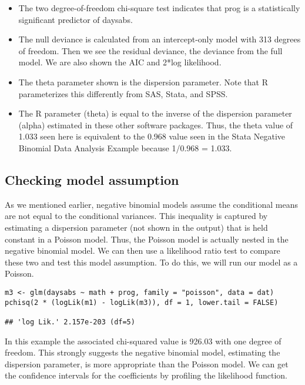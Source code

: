 \begin{itemize}
\item The two degree-of-freedom chi-square test indicates that prog is a statistically significant predictor of daysabs.
\item The null deviance is calculated from an intercept-only model with 313 degrees of freedom. Then we see the residual deviance, the deviance from the full model. We are also shown the AIC and 2*log likelihood. 
\item The theta parameter shown is the dispersion parameter. Note that R parameterizes this differently from SAS, Stata, and SPSS. 
\item The R parameter (theta) is equal to the inverse of the dispersion parameter (alpha) estimated in these other software packages. Thus, the theta value of 1.033 seen here is equivalent to the 0.968 value seen in the Stata Negative Binomial Data Analysis Example because 1/0.968 = 1.033. 
\end{itemize}
\newpage
\subsection{Checking model assumption}

As we mentioned earlier, negative binomial models assume the conditional means are not equal to the conditional variances. This inequality is captured by estimating a dispersion parameter (not shown in the output) that is held constant in a Poisson model. Thus, the Poisson model is actually nested in the negative binomial model. We can then use a likelihood ratio test to compare these two and test this model assumption. To do this, we will run our model as a Poisson.
\begin{framed}
\begin{verbatim}
m3 <- glm(daysabs ~ math + prog, family = "poisson", data = dat)
pchisq(2 * (logLik(m1) - logLik(m3)), df = 1, lower.tail = FALSE)

## 'log Lik.' 2.157e-203 (df=5)
\end{verbatim}
\end{framed}



In this example the associated chi-squared value is 926.03 with one degree of freedom.
This strongly suggests the negative binomial model, estimating the dispersion parameter, is more appropriate than the Poisson model.
We can get the confidence intervals for the coefficients by profiling the likelihood function.



